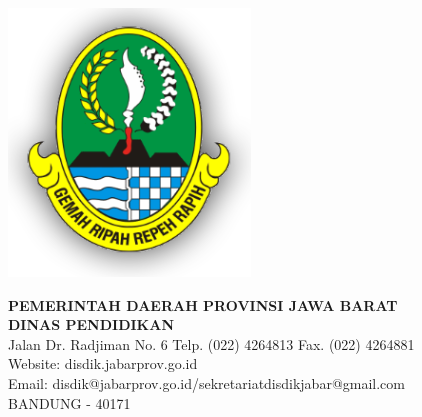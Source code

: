 \documentclass{article}
\begin{document}
\begin{minipage}{0.2\textwidth}
  \includegraphics[width=\linewidth]{assets/disdik_jabar_logo.png}
\end{minipage}
\hfill%
\begin{minipage}{0.75\textwidth}
  \centering
  {\selectfont
    {\large
    \textbf{PEMERINTAH DAERAH PROVINSI JAWA BARAT}\\
    }
    {\Large
    \textbf{DINAS PENDIDIKAN}\\
    }
  }
    \vspace{2mm} 
    Jalan Dr. Radjiman No. 6 Telp. (022) 4264813 Fax. (022) 4264881\\
    Website: disdik.jabarprov.go.id\\
    Email: disdik@jabarprov.go.id/sekretariatdisdikjabar@gmail.com\\
    BANDUNG - 40171
\end{minipage}
\newpage
\end{document}
